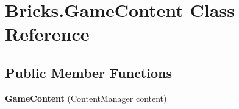 \hypertarget{class_bricks_1_1_game_content}{}\section{Bricks.\+Game\+Content Class Reference}
\label{class_bricks_1_1_game_content}
\subsection*{Public Member Functions}
\begin{DoxyCompactItemize}
\item 
\mbox{\label{class_bricks_1_1_game_content_aac4e727b9f243b50ce360238783ac009}} 
{\bfseries Game\+Content} (Content\+Manager content)
\end{DoxyCompactItemize}
